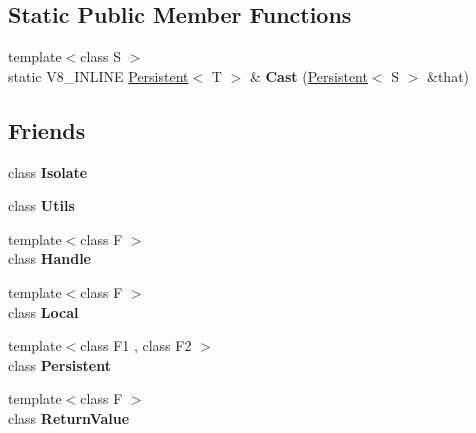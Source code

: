 \subsection*{Static Public Member Functions}
\begin{DoxyCompactItemize}
\item 
\hypertarget{classv8_1_1_persistent_aa20fd9af0b410df9e887689ef97c28dd}{}{\footnotesize template$<$class S $>$ }\\static V8\+\_\+\+I\+N\+L\+I\+N\+E \hyperlink{classv8_1_1_persistent}{Persistent}$<$ T $>$ \& {\bfseries Cast} (\hyperlink{classv8_1_1_persistent}{Persistent}$<$ S $>$ \&that)\label{classv8_1_1_persistent_aa20fd9af0b410df9e887689ef97c28dd}

\end{DoxyCompactItemize}
\subsection*{Friends}
\begin{DoxyCompactItemize}
\item 
\hypertarget{classv8_1_1_persistent_aba4f0964bdacf2bbf62cf876e5d28d0a}{}class {\bfseries Isolate}\label{classv8_1_1_persistent_aba4f0964bdacf2bbf62cf876e5d28d0a}

\item 
\hypertarget{classv8_1_1_persistent_abc0f7da619e9e72510dc07ed7b5ff6d8}{}class {\bfseries Utils}\label{classv8_1_1_persistent_abc0f7da619e9e72510dc07ed7b5ff6d8}

\item 
\hypertarget{classv8_1_1_persistent_a67ca1a2d91273eaf85fb3d23ba8ce984}{}{\footnotesize template$<$class F $>$ }\\class {\bfseries Handle}\label{classv8_1_1_persistent_a67ca1a2d91273eaf85fb3d23ba8ce984}

\item 
\hypertarget{classv8_1_1_persistent_afb872edb4aac7ba55f0da004113aa2b0}{}{\footnotesize template$<$class F $>$ }\\class {\bfseries Local}\label{classv8_1_1_persistent_afb872edb4aac7ba55f0da004113aa2b0}

\item 
\hypertarget{classv8_1_1_persistent_ad845ec8872174be0a9ca9a3dd1898d30}{}{\footnotesize template$<$class F1 , class F2 $>$ }\\class {\bfseries Persistent}\label{classv8_1_1_persistent_ad845ec8872174be0a9ca9a3dd1898d30}

\item 
\hypertarget{classv8_1_1_persistent_a53f604d3d6f2dc0647df33c9979f116a}{}{\footnotesize template$<$class F $>$ }\\class {\bfseries Return\+Value}\label{classv8_1_1_persistent_a53f604d3d6f2dc0647df33c9979f116a}

\end{DoxyCompactItemize}


